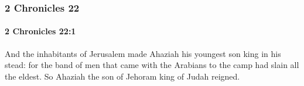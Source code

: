 	\subsubsection{2 Chronicles 22} %
		\label{2CHRONICLES-22}

		\paragraph{2 Chronicles 22:1} %
			\label{2CHRONICLES-22-1}

			And the inhabitants of Jerusalem made Ahaziah his youngest son king in his stead: for the band of men that came with the Arabians to the camp had slain all the eldest. So Ahaziah the son of Jehoram king of Judah reigned.


